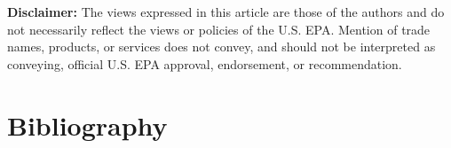 \begin{refsection}[referencesCh5]
\textbf{Disclaimer:} The views expressed in this article are those of the authors and do not necessarily reflect the views or policies of the U.S. EPA. Mention of trade names, products, or services does not convey, and should not be interpreted as conveying, official U.S. EPA approval, endorsement, or recommendation.

\section*{Bibliography}

\printbibliography[heading=none]
\end{refsection}